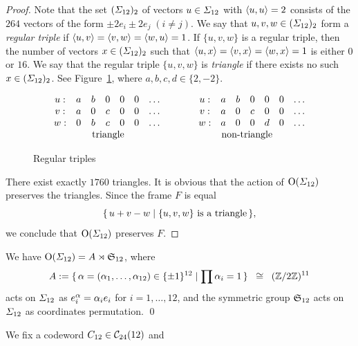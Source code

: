 \documentclass{amsart} %
\begin{document}
\begin{proof}
Note that the set $(\varSigma_{12})_2$ of vectors $u\in \varSigma_{12}$ with $\langle u, u \rangle=2$
consists of the $264$ vectors of the form $\pm 2 e_i\pm 2 e_j\; (i\ne j)$.
We say that $u, v, w\in( \varSigma_{12})_2$ form a \emph{regular triple} if 
$\langle u, v \rangle=\langle v, w \rangle=\langle w, u \rangle=1$.
If $\{u, v, w\}$ is a regular triple, then the number of 
vectors $x\in( \varSigma_{12})_2$ such that 
$\langle u, x \rangle=\langle v, x \rangle=\langle w, x \rangle=1$
is either $0$ or $16$.
We say that the regular triple $\{u, v, w\}$ is \emph{triangle} if there exists no such $x\in (\varSigma_{12})_2$.
See Figure~\ref{fig:triangle},
where $a, b, c , d\in \{2, -2\}$.
%
\begin{figure}
{\small
\[
\begin{array}{ccccccc}
u: & a& b & 0 & 0 & 0 &\dots\\
v: &a&0 & c & 0 & 0 &\dots\\
w: & 0& b & c & 0 & 0 & \dots\\
& \rlap{\textrm{\;\;\;\;\;triangle}} && &
\end{array}
\qquad\quad
\begin{array}{ccccccc}
u: &a& b & 0 & 0 & 0 &\dots\\
v: &a&0 & c & 0 & 0 & \dots\\
w: &a& 0 & 0 & d & 0 & \dots\\
\rlap{ \textrm{\;\;\;\;\;non-triangle}} && & &
\end{array}
\]
}
\vskip -1mm
\caption{Regular triples}\label{fig:triangle}
\end{figure}
%
There exist exactly $1760$ triangles.
It is obvious that the action of $\mathord{\mathrm{O}}(\varSigma_{12})$ preserves the triangles.
Since 
 the frame $F$ is equal 
\[
\{\,{u+v-w}\mid {\textrm{$\{u, v, w\}$ is a triangle}} \,\},
\]
we conclude that $\mathord{\mathrm{O}}(\varSigma_{12})$ preserves $F$.
\end{proof}
%
\begin{corollary}\label{cor:OGSigma}
We have $\mathord{\mathrm{O}}(\varSigma_{12})=A\rtimes\mathord{\mathfrak{S}}_{12}$,
where
\[
A:=\{\,{\alpha=(\alpha_1, \dots, \alpha_{12})\in \{\pm 1\}^{12}}\mid {\prod\alpha_i=1} \,\}\;\; \cong\;\; (\mathord{\mathbb{Z}}/2\mathord{\mathbb{Z}})^{11}
\]
acts on $\varSigma_{12}$ as $e_i\sp{\alpha}=\alpha_i e_i$ for $i=1, \dots, 12$, 
and
the symmetric group $\mathord{\mathfrak{S}}_{12}$ 
acts on $\varSigma_{12}$ as coordinates permutation.
\qed
\end{corollary}
%
We fix a codeword $C_{12}\in \mathord{\mathcal{C}}_{24}(12)$ and 
\end{document}
